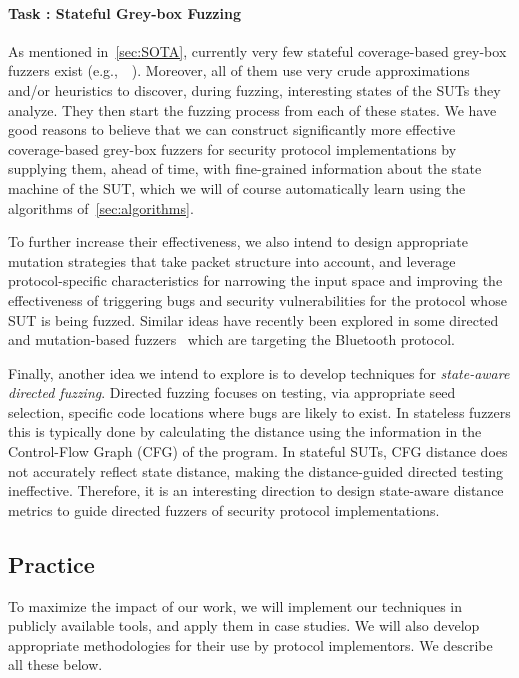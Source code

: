 \documentclass[11pt]{article}
\newcounter{Task}
\newcommand{\task}[1]{\addtocounter{Task}{1}\paragraph{Task \theTask: #1}}
\newcommand{\significance}[1]{\vspace*{-0.5em}%
  \begin{quoting}\noindent\textbf{Significance:} #1\end{quoting}}
\newcommand{\myparagraph}{}
\let\myparagraph=\paragraph
\renewcommand{\paragraph}{\vspace{-3mm}\myparagraph}
\newcommand{\eg}{e.\/g.,\ }
\begin{document}

\task{Stateful Grey-box Fuzzing}
As mentioned in~\cref{sec:SOTA}, currently very few stateful coverage-based
grey-box fuzzers exist (\eg~\cite{AFLNET@ICST-20,StateAFL@ESE-22}). Moreover,
all of them use very crude approximations and/or heuristics to discover,
during fuzzing, interesting states of the SUTs they analyze. They then
start the fuzzing process from each of these states. We have good reasons to
believe that we can construct significantly more effective coverage-based
grey-box fuzzers for security protocol implementations by supplying them,
ahead of time, with fine-grained information about the state machine of the
SUT, which we will of course automatically learn using the algorithms
of~\cref{sec:algorithms}.

To further increase their effectiveness, we also intend to design appropriate
mutation strategies that take packet structure into account, and leverage
protocol-specific characteristics for narrowing the input space and improving
the effectiveness of triggering bugs and security vulnerabilities for the
protocol whose SUT is being fuzzed. Similar ideas have recently been explored
in some directed~\cite{SweynTooth@ATC-20,Braktooth@USENIX-22} and
mutation-based fuzzers~\cite{Frankenstein@USENIX-20} which are targeting the
Bluetooth protocol.

Finally, another idea we intend to explore is to develop techniques for
\emph{state-aware directed fuzzing}. Directed fuzzing focuses on testing,
via appropriate seed selection, specific code locations where bugs are likely to
exist. In stateless fuzzers this is typically done by calculating the distance
using the information in the Control-Flow Graph (CFG) of the program. In
stateful SUTs, CFG distance does not accurately reflect state distance, making
the distance-guided directed testing ineffective. Therefore, it is an
interesting direction to design state-aware distance metrics to guide
directed fuzzers of security protocol implementations.


\subsection{Practice}
To maximize the impact of our work, we will implement our techniques in
publicly available tools, and apply them in case studies. We will also develop
appropriate methodologies for their use by protocol implementors. We describe
all these below.
\end{document}
